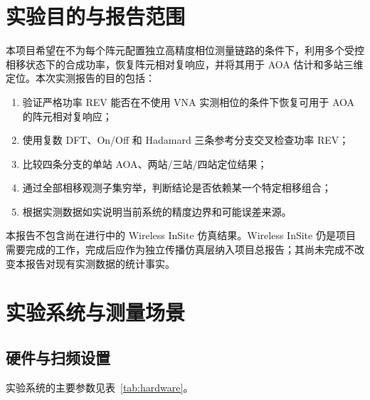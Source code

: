 \documentclass[UTF8,12pt,a4paper]{ctexart}
\begin{document}
\tableofcontents
\clearpage
{}

\section{实验目的与报告范围}

本项目希望在不为每个阵元配置独立高精度相位测量链路的条件下，利用多个受控相移状态下的合成功率，恢复阵元相对复响应，并将其用于 AOA 估计和多站三维定位。本次实测报告的目的包括：

\begin{enumerate}
  \item 验证严格功率 REV 能否在不使用 VNA 实测相位的条件下恢复可用于 AOA 的阵元相对复响应；
  \item 使用复数 DFT、On/Off 和 Hadamard 三条参考分支交叉检查功率 REV；
  \item 比较四条分支的单站 AOA、两站/三站/四站定位结果；
  \item 通过全部相移观测子集穷举，判断结论是否依赖某一个特定相移组合；
  \item 根据实测数据如实说明当前系统的精度边界和可能误差来源。
\end{enumerate}

本报告不包含尚在进行中的 Wireless InSite 仿真结果。Wireless InSite 仍是项目需要完成的工作，完成后应作为独立传播仿真层纳入项目总报告；其尚未完成不改变本报告对现有实测数据的统计事实。

\section{实验系统与测量场景}

\subsection{硬件与扫频设置}

实验系统的主要参数见表~\ref{tab:hardware}。
\end{document}
